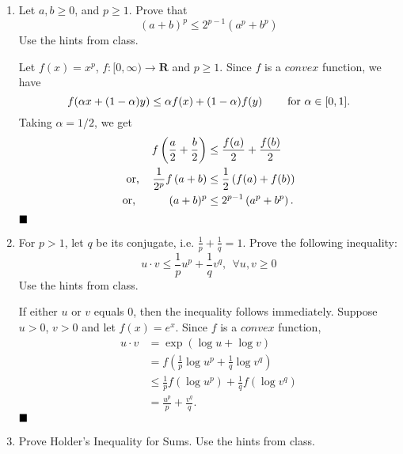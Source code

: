\documentclass[12pt]{article}
\newcommand{\qed}{$\hfill\blacksquare$}
\newcommand{\ds}{\displaystyle}
\begin{document}
\begin{enumerate}
 
 \item Let $a, b \geq 0$, and $p \geq 1$. Prove that 
 $$(a+b)^p \leq 2^{p-1} (a^p + b^p)$$
  Use the hints from class.

\begin{mybox}

  Let $f(x)=x^p$, $f:[0, \infty)\to \mathbf{R}$ and
    $p\geq 1$. Since $f$ is a $convex$ function, we have
    $$f(\alpha x +(1-\alpha)y)\leq\alpha f(x)+(1-\alpha)
    f(y)\hspace{8mm}\text{for } \alpha\in [0,1].$$
    Taking $\alpha=1/2$, we get
    \begin{align*}
        f\left(\frac{a}{2}+\frac{b}{2}\right)
        &\leq \frac{f(a)}{2}+\frac{f(b)}{2}\\
        \text{or, }\hspace{3mm}
        \frac{1}{2^p}f\left(a+b\right)
        &\leq \frac{1}{2}\left(f(a)+f(b)\right)\\
        \text{or, }\hspace{9.5mm} (a+b)^p
        &\leq 2^{p-1}\left(a^p+b^p\right).
    \end{align*}\qed
  \end{mybox}

\item For $p >1$, let $q$ be its conjugate, i.e. $\ds \frac{1}{p} + \frac{1}{q} = 1$. Prove the following inequality:
  $$\ds u \cdot v \leq \frac{1}{p} u^p + \frac{1}{q} v^q, \ \ \forall u, v \geq 0$$
  Use the hints from class. 
\begin{mybox}

  If either $u$ or $v$ equals $0$, then the inequality
    follows immediately. Suppose $u>0$, $v>0$ and let
    $f(x) = e^x$. Since $f$ is a $convex$ function,
    \begin{align*}
        u\cdot v &= \exp\left({\log{u}+\log{v}}\right)\\
        &= f\left(\frac{1}{p}\log{u^p} +\frac{1}{q}
        \log{v^q}\right)\\
        &\leq \frac{1}{p}f(\log{u^p})+\frac{1}{q}f(\log{v^q})\\
        &= \frac{u^p}{p}+\frac{v^q}{q}.
    \end{align*}
    \qed
\end{mybox}

    
  \item Prove Holder's Inequality for Sums. Use the hints from class. 
  
  \begin{mybox}
    

\end{mybox}
\end{enumerate}
\end{document}

